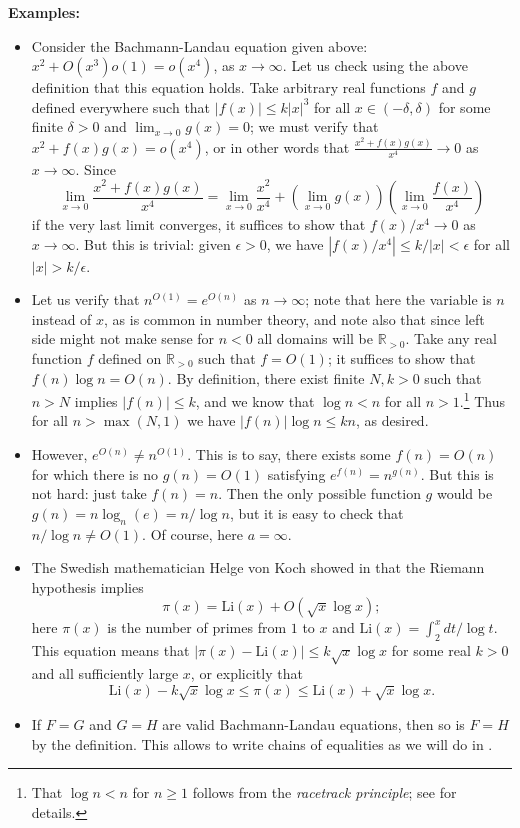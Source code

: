 \documentclass{article}
\theoremstyle{definition}
\newcommand\RR{\mathbb R}
\newcommand\abs[1]{\left\lvert#1\right\rvert}
\newcommand\Li{\mathrm{Li}}
\begin{document}
\textbf{Examples:}

\begin{itemize}
    \item Consider the Bachmann-Landau equation given above: \(x^2 + O(x^3)o(1) = o(x^4)\), as \(x\to\infty\).
        Let us check using the above definition that this equation holds.
        Take arbitrary real functions \(f\) and \(g\) defined everywhere such that \(\abs{f(x)} \leq k\abs{x}^3\) for all \(x\in(-\delta,\delta)\) for some finite \(\delta>0\) and \(\lim_{x\to 0} g(x) = 0\); we must verify that \(x^2 + f(x)g(x) = o(x^4)\), or in other words that \(\frac{x^2 + f(x)g(x)}{x^4}\to 0\) as \(x\to\infty\).
        Since
        \[\lim_{x\to 0} \frac{x^2 + f(x)g(x)}{x^4} = \lim_{x\to 0} \frac{x^2}{x^4} + \left(\lim_{x\to 0} g(x)\right)\left(\lim_{x\to 0} \frac{f(x)}{x^4}\right)\]
        if the very last limit converges, it suffices to show that \(f(x)/x^4 \to 0\) as \(x\to\infty\).
        But this is trivial: given \(\epsilon > 0\), we have \(\abs{f(x)/x^4} \le k/\abs{x} < \epsilon\) for all \(\abs{x} > k/\epsilon\).

    \item Let us verify that \(n^{O(1)} = e^{O(n)}\) as \(n\to\infty\); note that here the variable is \(n\) instead of \(x\), as is common in number theory, and note also that since left side might not make sense for \(n<0\) all domains will be \(\RR_{>0}\).
        Take any real function \(f\) defined on \(\RR_{>0}\) such that \(f = O(1)\); it suffices to show that \(f(n)\log n = O(n)\).
        By definition, there exist finite \(N,k>0\) such that \(n>N\) implies \(\abs{f(n)} \le k\), and we know that \(\log n < n\) for all \(n>1\).\footnote{That \(\log n < n\) for \(n\ge 1\) follows from the \textit{racetrack principle}; see \cite{Spivey2011} for details.}
        Thus for all \(n > \max(N,1)\) we have \(\abs{f(n)}\log n \le kn\), as desired.

    \item However, \(e^{O(n)} \ne n^{O(1)}\).
        This is to say, there exists some \(f(n) = O(n)\) for which there is no \(g(n) = O(1)\) satisfying \(e^{f(n)} = n^{g(n)}\).
        But this is not hard: just take \(f(n) = n\).
        Then the only possible function \(g\) would be \(g(n) = n\log_n(e) = n/\log n\), but it is easy to check that \(n/\log n \ne O(1)\).
        Of course, here \(a=\infty\).

    \item The Swedish mathematician Helge von Koch showed in \cite{Koch1901} that the Riemann hypothesis implies
        \[\pi(x) = \Li(x) + O(\sqrt x \log x);\]
        here \(\pi(x)\) is the number of primes from \(1\) to \(x\) and \(\Li(x) = \int_2^x dt/\log t\).
        This equation means that \(\abs{\pi(x) - \Li(x)} \le k\sqrt x \log x\) for some real \(k>0\) and all sufficiently large \(x\), or explicitly that
        \[\Li(x) - k\sqrt x \log x \le \pi(x) \le \Li(x) + \sqrt x\log x.\]

    \item If \(F=G\) and \(G=H\) are valid Bachmann-Landau equations, then so is \(F=H\) by the definition.
        This allows to write chains of equalities as we will do in .
\end{itemize}
\end{document}
